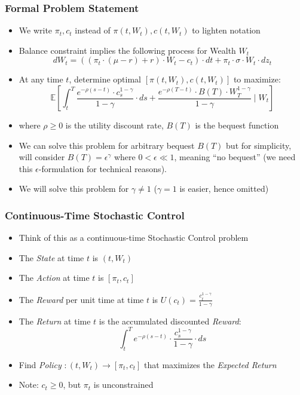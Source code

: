 \documentclass[handout]{beamer}
\begin{document}
\begin{frame}
\frametitle{Formal Problem Statement}
\pause
\begin{itemize}[<+->]
\item We write $\pi_t, c_t$ instead of $\pi(t, W_t), c(t, W_t)$ to lighten notation
\item Balance constraint implies the following process for Wealth $W_t$
$$dW_t = ((\pi_t \cdot (\mu - r) + r) \cdot W_t - c_t) \cdot dt + \pi_t \cdot \sigma \cdot W_t \cdot dz_t$$
\item At any time $t$, determine optimal $[\pi(t,W_t), c(t, W_t)]$ to maximize:
$$\mathbb{E}[\int_t^T \frac {e^{-\rho (s-t)} \cdot c_s^{1-\gamma}} {1-\gamma} \cdot ds + \frac {e^{-\rho (T-t)} \cdot B(T) \cdot W_T^{1-\gamma}} {1-\gamma} \mid W_t]$$
\item where $\rho \geq 0$ is the utility discount rate, $B(T)$ is the bequest function
\item We can solve this problem for arbitrary bequest $B(T)$ but for simplicity, will consider $B(T) = \epsilon^{\gamma}$
where $0 < \epsilon \ll 1$, meaning ``no bequest'' (we need this $\epsilon$-formulation for technical reasons).
\item We will solve this problem for $\gamma \neq 1$ ($\gamma = 1$ is easier, hence omitted)
\end{itemize}
\end{frame}

\begin{frame}
\frametitle{Continuous-Time Stochastic Control}
\begin{itemize}[<+->]
\item Think of this as a continuous-time Stochastic Control problem
\item The {\em State} at time $t$ is $(t, W_t)$
\item The {\em Action} at time $t$ is $[\pi_t, c_t]$
\item The {\em Reward} per unit time at time $t$ is $U(c_t) = \frac {c_t^{1 - \gamma}} {1 - \gamma}$ 
\item The {\em Return} at time $t$ is the accumulated discounted {\em Reward}:
$$\int_t^T e^{-\rho(s-t)} \cdot \frac {c_s^{1-\gamma}} {1-\gamma} \cdot ds$$
\item Find {\em Policy} $: (t, W_t) \rightarrow [\pi_t, c_t]$ that maximizes the {\em Expected Return}
\item Note: $c_t \geq 0$, but $\pi_t$ is unconstrained
\end{itemize}
\end{frame}
\end{document}
